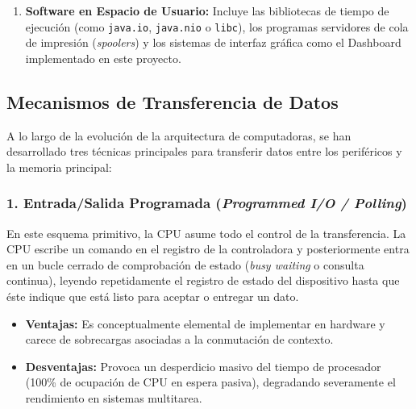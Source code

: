 \documentclass[11pt,letterpaper]{article}
\begin{document}
\begin{enumerate}
\begin{itemize}
        \item \textit{Protección y control de acceso:} Validación de permisos de lectura y escritura según el usuario y grupo.
        \item \textit{Buffering y Caching:} Asignación de búferes intermedios en memoria del kernel para mitigar desfases de velocidad.
        \item \textit{Bloqueo y asignación de dispositivos:} Garantizar que dispositivos de acceso exclusivo (como una impresora) no sean corrompidos por accesos concurrentes no serializados.
    \end{itemize}
    \item \textbf{Software en Espacio de Usuario:} Incluye las bibliotecas de tiempo de ejecución (como \texttt{java.io}, \texttt{java.nio} o \texttt{libc}), los programas servidores de cola de impresión (\textit{spoolers}) y los sistemas de interfaz gráfica como el Dashboard implementado en este proyecto.
\end{enumerate}

\subsection{Mecanismos de Transferencia de Datos}

A lo largo de la evolución de la arquitectura de computadoras, se han desarrollado tres técnicas principales para transferir datos entre los periféricos y la memoria principal:

\subsubsection{1. Entrada/Salida Programada (\textit{Programmed I/O / Polling})}
En este esquema primitivo, la CPU asume todo el control de la transferencia. La CPU escribe un comando en el registro de la controladora y posteriormente entra en un bucle cerrado de comprobación de estado (\textit{busy waiting} o consulta continua), leyendo repetidamente el registro de estado del dispositivo hasta que éste indique que está listo para aceptar o entregar un dato.
\begin{itemize}
    \item \textbf{Ventajas:} Es conceptualmente elemental de implementar en hardware y carece de sobrecargas asociadas a la conmutación de contexto.
    \item \textbf{Desventajas:} Provoca un desperdicio masivo del tiempo de procesador (100\% de ocupación de CPU en espera pasiva), degradando severamente el rendimiento en sistemas multitarea.
\end{itemize}
\end{document}
